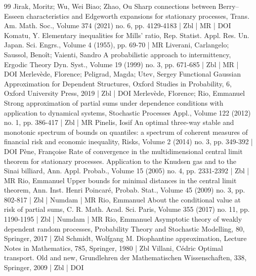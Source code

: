 \documentclass[10pt]{amsart}
\theoremstyle{definition}\newtheorem{defi}[theo]{Definition}\newtheorem{rema}[theo]{Remark}\newtheorem{exam}[theo]{Example}\newtheorem{exem}[theo]{Example}\newtheorem{nota}[theo]{Notation}
\begin{document}
\begin{thebibliography}{99}
 Jirak, Moritz; Wu, Wei Biao; Zhao, Ou Sharp connections between Berry–Esseen characteristics and Edgeworth expansions for stationary processes, Trans. Am. Math. Soc., Volume 374 (2021) no. 6, pp. 4129-4183 | Zbl | MR | DOI
 Komatu, Y. Elementary inequalities for Mills’ ratio, Rep. Statist. Appl. Res. Un. Japan. Sci. Engrs., Volume 4 (1955), pp. 69-70 | MR
 Liverani, Carlangelo; Saussol, Benoît; Vaienti, Sandro A probabilistic approach to intermittency, Ergodic Theory Dyn. Syst., Volume 19 (1999) no. 3, pp. 671-685 | Zbl | MR | DOI
 Merlevède, Florence; Peligrad, Magda; Utev, Sergey Functional Gaussian Approximation for Dependent Structures, Oxford Studies in Probability, 6, Oxford University Press, 2019 | Zbl | DOI
 Merlevède, Florence; Rio, Emmanuel Strong approximation of partial sums under dependence conditions with application to dynamical systems, Stochastic Processes Appl., Volume 122 (2012) no. 1, pp. 386-417 | Zbl | MR
 Pinelis, Iosif An optimal three-way stable and monotonic spectrum of bounds on quantiles: a spectrum of coherent measures of financial risk and economic inequality, Risks, Volume 2 (2014) no. 3, pp. 349-392 | DOI
 Pène, Françoise Rate of convergence in the multidimensional central limit theorem for stationary processes. Application to the Knudsen gas and to the Sinai billiard, Ann. Appl. Probab., Volume 15 (2005) no. 4, pp. 2331-2392 | Zbl | MR
 Rio, Emmanuel Upper bounds for minimal distances in the central limit theorem, Ann. Inst. Henri Poincaré, Probab. Stat., Volume 45 (2009) no. 3, pp. 802-817 | Zbl | Numdam | MR
 Rio, Emmanuel About the conditional value at risk of partial sums, C. R. Math. Acad. Sci. Paris, Volume 355 (2017) no. 11, pp. 1190-1195 | Zbl | Numdam | MR
 Rio, Emmanuel Asymptotic theory of weakly dependent random processes, Probability Theory and Stochastic Modelling, 80, Springer, 2017 | Zbl
 Schmidt, Wolfgang M. Diophantine approximation, Lecture Notes in Mathematics, 785, Springer, 1980 | Zbl
 Villani, Cédric Optimal transport. Old and new, Grundlehren der Mathematischen Wissenschaften, 338, Springer, 2009 | Zbl | DOI
\end{thebibliography}
\end{document}

